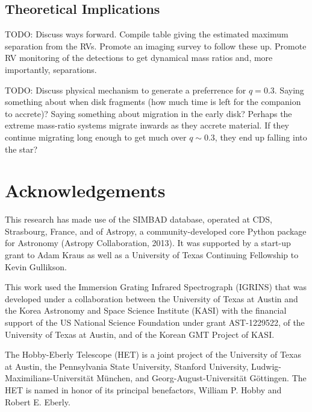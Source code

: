 \documentclass{emulateapj}
\begin{document}
\subsection{Theoretical Implications}

TODO: Discuss ways forward. Compile table giving the estimated maximum separation from the RVs. Promote an imaging survey to follow these up. Promote RV monitoring of the detections to get dynamical mass ratios and, more importantly, separations.

TODO: Discuss physical mechanism to generate a preferrence for $q = 0.3$. Saying something about when disk fragments (how much time is left for the companion to accrete)? Saying something about migration in the early disk? Perhaps the extreme mass-ratio systems migrate inwards as they accrete material. If they continue migrating long enough to get much over $q \sim 0.3$, they end up falling into the star?





\section*{Acknowledgements}
This research has made use of the SIMBAD database, operated at CDS, Strasbourg, France, and of Astropy, a community-developed core Python package for Astronomy (Astropy Collaboration, 2013).
It was supported by a start-up grant to Adam Kraus as well as a University of Texas Continuing Fellowship to Kevin Gullikson.

This work used the Immersion Grating Infrared Spectrograph (IGRINS) that was developed under a collaboration between the University of Texas at Austin and the Korea Astronomy and Space Science Institute (KASI) with the financial support of the US National Science Foundation under grant AST-1229522, of the University of Texas at Austin, and of the Korean GMT Project of KASI.

The Hobby-Eberly Telescope (HET) is a joint project of the University of Texas at Austin, the Pennsylvania State University, Stanford University, Ludwig-Maximilians-Universit\"at M\"unchen, and Georg-August-Universit\"at G\"ottingen. The HET is named in honor of its principal benefactors, William P. Hobby and Robert E. Eberly.
\end{document}
